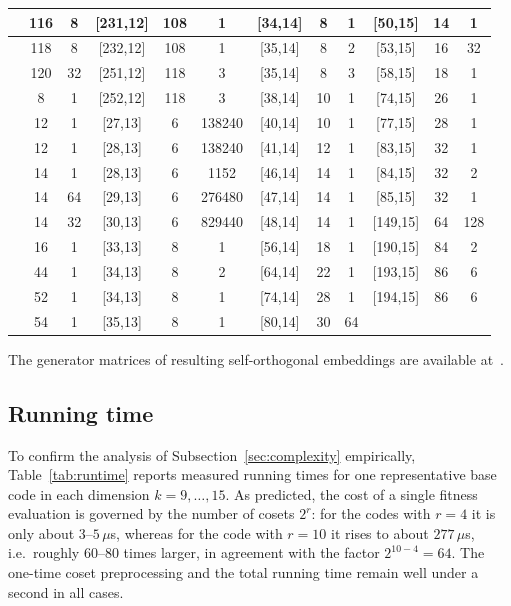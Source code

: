 \documentclass{article}
\begin{document}
\begin{longtable}{c|c|c||c|c|c||c|c|c||c|c|c}
\hline
[244,10] & 116 & 8 & [231,12] & 108 & 1
& [34,14] & 8 & 1 & [50,15] & 14 & 1 \\
\hline
[248,10] & 118 & 8 & [232,12] & 108 & 1
& [35,14] & 8 & 2 & [53,15] & 16 & 32 \\
\hline
[251,10] & 120 & 32 & [251,12] & 118 & 3
& [35,14] & 8 & 3 & [58,15] & 18 & 1 \\
\hline
[31,11] & 8 & 1 & [252,12] & 118 & 3
& [38,14] & 10 & 1 & [74,15] & 26 & 1 \\
\hline
[37,11] & 12 & 1 & [27,13] & 6 & 138240
& [40,14] & 10 & 1 & [77,15] & 28 & 1 \\
\hline
[39,11] & 12 & 1 & [28,13] & 6 & 138240
& [41,14] & 12 & 1 & [83,15] & 32 & 1 \\
\hline
[41,11] & 14 & 1 & [28,13] & 6 & 1152
& [46,14] & 14 & 1 & [84,15] & 32 & 2 \\
\hline
[42,11] & 14 & 64 & [29,13] & 6 & 276480
& [47,14] & 14 & 1 & [85,15] & 32 & 1 \\
\hline
[43,11] & 14 & 32 & [30,13] & 6 & 829440
& [48,14] & 14 & 1 & [149,15] & 64 & 128 \\
\hline
[46,11] & 16 & 1 & [33,13] & 8 & 1
& [56,14] & 18 & 1 & [190,15] & 84 & 2 \\
\hline
[104,11] & 44 & 1 & [34,13] & 8 & 2
& [64,14] & 22 & 1 & [193,15] & 86 & 6 \\
\hline
[119,11] & 52 & 1 & [34,13] & 8 & 1
& [74,14] & 28 & 1 & [194,15] & 86 & 6 \\
\hline
[121,11] & 54 & 1 & [35,13] & 8 & 1
& [80,14] & 30 & 64 & & & \\
\hline
\end{longtable}
\endgroup
The generator matrices of resulting self-orthogonal embeddings are available at~\cite{github}.

\subsection{Running time}
To confirm the analysis of Subsection~\ref{sec:complexity} empirically, Table~\ref{tab:runtime} reports measured running times for one representative base code in each dimension $k=9,\ldots,15$. As predicted, the cost of a single fitness evaluation is governed by the number of cosets $2^{r}$: for the codes with $r=4$ it is only about $3$--$5\,\mu$s, whereas for the code with $r=10$ it rises to about $277\,\mu$s, i.e.\ roughly $60$--$80$ times larger, in agreement with the factor $2^{10-4}=64$. The one-time coset preprocessing and the total running time remain well under a second in all cases.
\end{document}

